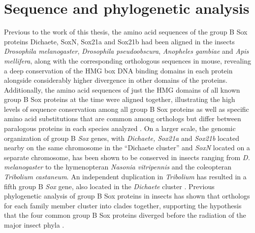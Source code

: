 \section{Sequence and phylogenetic analysis}
Previous to the work of this thesis, the amino acid sequences of the group B Sox proteins Dichaete, SoxN, Sox21a and Sox21b had been aligned in the insects \emph{Drosophila melanogaster}, \emph{Drosophila pseudoobscura}, \emph{Anopheles gambiae} and \emph{Apis mellifera}, along with the corresponding orthologous sequences in mouse, revealing a deep conservation of the HMG box DNA binding domains in each protein alongside considerably higher divergence in other domains of the proteins. Additionally, the amino acid sequences of just the HMG domains of all known group B Sox proteins at the time were aligned together, illustrating the high levels of sequence conservation among all group B Sox proteins as well as specific amino acid substitutions that are common among orthologs but differ between paralogous proteins in each species analyzed \citep{mckimmie_conserved_2005}. On a larger scale, the genomic organization of group B \emph{Sox} genes, with \emph{Dichaete, Sox21a} and \emph{Sox21b} located nearby on the same chromosome in the “Dichaete cluster” and \emph{SoxN} located on a separate chromosome, has been shown to be conserved in insects ranging from \emph{D. melanogaster} to the hymenopteran \emph{Nasonia vitripennis} and the coleopteran \emph{Tribolium castaneum}. An independent duplication in \emph{Tribolium} has resulted in a fifth group B \emph{Sox} gene, also located in the \emph{Dichaete} cluster \citep{phochanukul_no_2010}. Previous phylogenetic analysis of group B Sox proteins in insects has shown that orthologs for each family member cluster into clades together, supporting the hypothesis that the four common group B Sox proteins diverged before the radiation of the major insect phyla \citep{wilson_evolution_2008,zhong_parallel_2011}.\\

